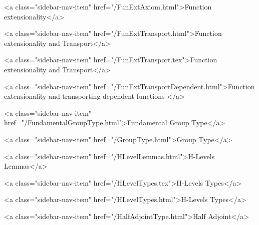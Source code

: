       
    
      
        
          <a class="sidebar-nav-item" href="/FunExtAxiom.html">Function extensionality</a>
        
      
    
      
        
          <a class="sidebar-nav-item" href="/FunExtTransport.html">Function extensionality and Transport</a>
        
      
    
      
        
          <a class="sidebar-nav-item" href="/FunExtTransport.tex">Function extensionality and Transport</a>
        
      
    
      
        
          <a class="sidebar-nav-item" href="/FunExtTransportDependent.html">Function extensionality and transporting dependent functions </a>
        
      
    
      
        
          <a class="sidebar-nav-item" href="/FundamentalGroupType.html">Fundamental Group Type</a>
        
      
    
      
        
          <a class="sidebar-nav-item" href="/GroupType.html">Group Type</a>
        
      
    
      
        
          <a class="sidebar-nav-item" href="/HLevelLemmas.html">H-Levels Lemmas</a>
        
      
    
      
        
          <a class="sidebar-nav-item" href="/HLevelTypes.tex">H-Levels Types</a>
        
      
    
      
        
          <a class="sidebar-nav-item" href="/HLevelTypes.html">H-Levels Types</a>
        
      
    
      
        
          <a class="sidebar-nav-item" href="/HalfAdjointType.html">Half Adjoint</a>
        
      
    
      
        
